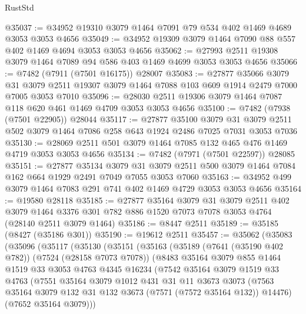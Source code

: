 \begin{lexlean}{RustStd}
\begin{coremodule}
{\begin{coremodule}
{{{{{{{{{{{{{{{{{{{{{{{{{{{{{{{{@35037 := @34952 @19310 @3079 @1464 @7091 @79 @534 @402 @1469 @4689 @3053 @3053 @4656
@35049 := @34952 @19309 @3079 @1464 @7090 @88 @557 @402 @1469 @4694 @3053 @3053 @4656
@35062 := @27993 @2511 @19308 @3079 @1464 @7089 @94 @586 @403 @1469 @4699 @3053 @3053 @4656
@35066 := @7482 (@7911 (@7501 @16175)) @28007
@35083 := @27877
    @35066
    @3079
    @31
    @3079
    @2511
    @19307
    @3079
    @1464
    @7088
    @103
    @609
    @1914
    @2479
    @7000
    @7005
    @3053
    @7010
@35096 := @28030 @2511 @19306 @3079 @1464 @7087 @118 @620 @461 @1469 @4709 @3053 @3053 @4656
@35100 := @7482 (@7938 (@7501 @22905)) @28044
@35117 := @27877
    @35100
    @3079
    @31
    @3079
    @2511
    @502
    @3079
    @1464
    @7086
    @258
    @643
    @1924
    @2486
    @7025
    @7031
    @3053
    @7036
@35130 := @28069 @2511 @501 @3079 @1464 @7085 @132 @465 @476 @1469 @4719 @3053 @3053 @4656
@35134 := @7482 (@7971 (@7501 @22597)) @28085
@35151 := @27877
    @35134
    @3079
    @31
    @3079
    @2511
    @500
    @3079
    @1464
    @7084
    @162
    @664
    @1929
    @2491
    @7049
    @7055
    @3053
    @7060
@35163 := @34952 @499 @3079 @1464 @7083 @291 @741 @402 @1469 @4729 @3053 @3053 @4656
@35164 := @19580 @28118
@35185 := @27877
    @35164
    @3079
    @31
    @3079
    @2511
    @402
    @3079
    @1464
    @3376
    @301
    @782
    @886
    @1520
    @7073
    @7078
    @3053
    @4764
    (@28140 @2511 @3079 @1464)
@35186 := @8447 @2511
@35189 := @35185 (@8427 (@35186 @301))
@35190 := @19612 @2511
@35457 := @35062
    (@35083
      (@35096
        (@35117
          (@35130
            (@35151
              (@35163
                (@35189
                  (@7641 (@35190 @402 @782))
                  (@7524 (@28158 @7073 @7078))
                  (@8483
                    @35164
                    @3079
                    @855
                    @1464
                    @1519
                    @33
                    @3053
                    @4763
                    @4345
                    @16234
                    (@7542
                      @35164
                      @3079
                      @1519
                      @33
                      @4763
                      (@7551
                        @35164
                        @3079
                        @1012
                        @431
                        @31
                        @11
                        @3673
                        @3073
                        (@7563 @35164 @3079 @132 @31 @132 @3673 (@7571 (@7572 @35164 @132)) @14476)
                        (@7652 @35164 @3079)))
}}}}}}}}}}}}}}}}}}}}}}}}}}}}}}}}
\end{coremodule}}
\end{coremodule}
\end{lexlean}
